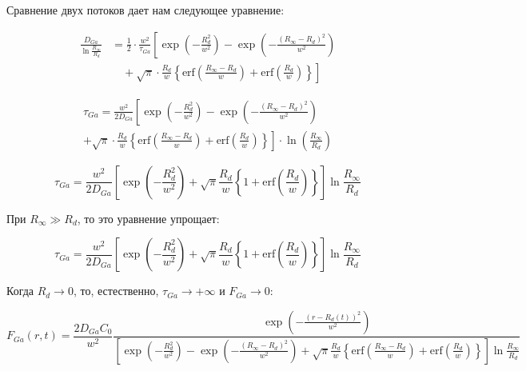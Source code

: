 \documentclass[14pt,oneside]{extarticle}
\begin{document}
Сравнение двух потоков дает нам следующее уравнение:

\[
    \begin{split}
    \frac{D_{Ga}}{\ln\frac{R_{\infty}}{R_{d}}} &= \frac{1}{2} \cdot \frac{w^{2}}{\tau_{Ga}} \left[
    \exp\left(-\frac{R_{d}^{2}}{w^{2}}\right)
    - \exp\left(-\frac{(R_{\infty} - R_{d})^{2}}{w^{2}}\right) \right. \\
    &\quad + \left. \sqrt{\pi} \cdot \frac{R_{d}}{w}
    \left\{ \text{erf}\left(\frac{R_{\infty} - R_{d}}{w}\right)
    + \text{erf}\left(\frac{R_{d}}{w}\right) \right\}
    \right]
    \end{split}
\]
    

\begin{equation}
    \begin{split}
    \tau_{Ga} = \frac{w^{2}}{2 D_{Ga}} \left[
    \exp\left(-\frac{R_{d}^{2}}{w^{2}}\right)
    - \exp\left(-\frac{(R_{\infty} - R_{d})^{2}}{w^{2}}\right) \right. \\
    \left. + \sqrt{\pi} \cdot \frac{R_{d}}{w}
    \left\{ \text{erf}\left(\frac{R_{\infty} - R_{d}}{w}\right)
    + \text{erf}\left(\frac{R_{d}}{w}\right) \right\}
    \right] \cdot \ln\left(\frac{R_{\infty}}{R_{d}}\right)
    \end{split}
\end{equation}

\begin{equation}
\tau_{Ga}=\frac{w^{2}}{2D_{Ga}}\left[\exp\left(-\frac{R_{d}^{2}}{w^{2}}\right)+\sqrt{\pi}\frac{R_{d}}{w}\left\{ 1+\text{erf}\left(\frac{R_{d}}{w}\right)\right\} \right]\ln\frac{R_{\infty}}{R_{d}}
\end{equation}

При $R_{\infty}\gg R_{d}$, то это уравнение упрощает:

\begin{equation}
\tau_{Ga}=\frac{w^{2}}{2D_{Ga}}\left[\exp\left(-\frac{R_{d}^{2}}{w^{2}}\right)+\sqrt{\pi}\frac{R_{d}}{w}\left\{ 1+\text{erf}\left(\frac{R_{d}}{w}\right)\right\} \right]\ln\frac{R_{\infty}}{R_{d}}
\end{equation}

Когда $R_{d}\to0$, то, естественно, $\tau_{Ga}\to+\infty$ и $F_{Ga}\to0$:

\begin{equation}
F_{Ga}\left(r,t\right)=\frac{2D_{Ga}C_{0}}{w^{2}}\frac{\exp\left(-\frac{\left(r-R_{d}\left(t\right)\right)^{2}}{w^{2}}\right)}{\left[\exp\left(-\frac{R_{d}^{2}}{w^{2}}\right)-\exp\left(-\frac{\left(R_{\infty}-R_{d}\right)^{2}}{w^{2}}\right)+\sqrt{\pi}\frac{R_{d}}{w}\left\{ \text{erf}\left(\frac{R_{\infty}-R_{d}}{w}\right)+\text{erf}\left(\frac{R_{d}}{w}\right)\right\} \right]\ln\frac{R_{\infty}}{R_{d}}}
\end{equation}
\end{document}
